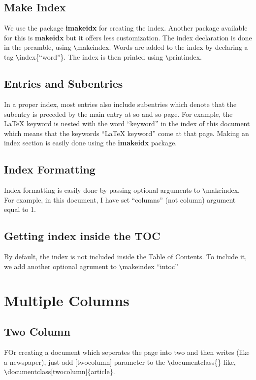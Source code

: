 \documentclass[12pt letterpaper]{article}
\begin{document}
    \subsection{Make Index}
    We use the package \textbf{imakeidx} for creating the index. Another package available
    for this is \textbf{makeidx} but it offers less customization.
    The index declaration is done in the preamble, using \verb!\!makeindex.
    Words are added to the index by declaring a tag \verb!\!index\{``word''\}.
    The index is then printed using \verb!\!printindex.

    \subsection{Entries and Subentries}
    In a proper index, most entries also include subentries which denote that 
    the subentry is preceded by the main entry at so and so page.
    For example, the \LaTeX{} keyword  is nested with the word ``keyword'' in the index of this document
    which means that the keywords ``\LaTeX{} keyword'' come at that page.
    Making an index  section  is easily done using the 
    \textbf{imakeidx} package.

    \subsection{Index Formatting} 
    Index formatting is easily done by passing optional arguments to \verb!\!makeindex.
    For example, in this document, I have set ``columns'' (not column) argument equal to 1.

    \subsection{Getting index inside the TOC}
    By default, the index is not included inside the Table of Contents. 
    To include it, we add another optional agrument to \verb!\!makeindex ``intoc''
    
\clearpage

\section{Multiple Columns}
    \subsection{Two Column}
    FOr creating a document which seperates the page into two and then writes
    (like a newspaper), just add [twocolumn] parameter to the \verb!\!documentclass\{\}
    like, \verb!\!documentclass[twocolumn]\{article\}.
\end{document}
